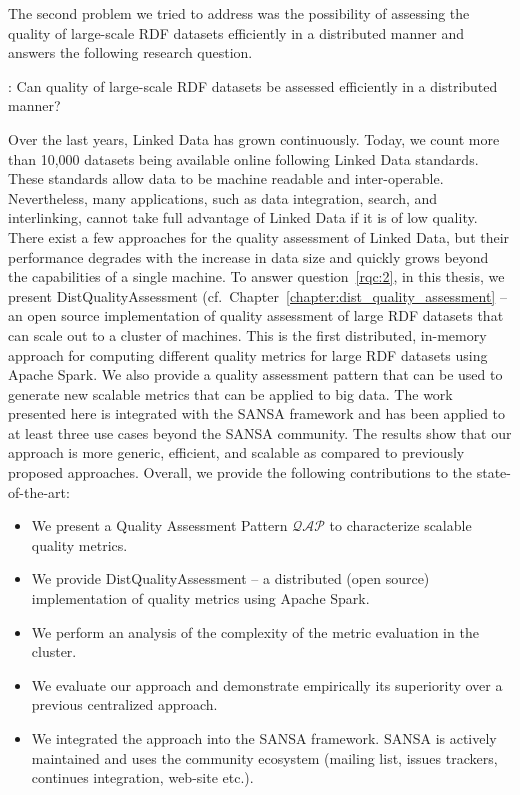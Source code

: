 The second problem we tried to address was the possibility of assessing the quality of large-scale \gls{RDF} datasets efficiently in a distributed manner and answers the following research question.

\begin{tcolorbox}
\textbf{\rqNr[RQ2]\label{rqc:2}}: Can quality of large-scale \gls{RDF} datasets be assessed efficiently in a distributed manner?
\end{tcolorbox}

Over the last years, Linked Data has grown continuously. 
Today, we count more than 10,000 datasets being available online following Linked Data standards. 
These standards allow data to be machine readable and inter-operable.  
Nevertheless, many applications, such as data integration, search, and interlinking, cannot take full advantage of Linked Data if it is of low quality.
There exist a few approaches for the quality assessment of Linked Data, but their performance degrades with the increase in data size and quickly grows beyond the capabilities of a single machine.
To answer question~\ref{rqc:2}, in this thesis, we present DistQualityAssessment (cf.\ Chapter~\ref{chapter:dist_quality_assessment} -- an open source implementation of quality assessment of large \gls{RDF} datasets that can scale out to a cluster of machines.
This is the first distributed, in-memory approach for computing different quality metrics for large \gls{RDF} datasets using Apache Spark. We also provide a quality assessment pattern that can be used to generate new scalable metrics that can be applied to big data.
The work presented here is integrated with the SANSA framework and has been applied to at least three use cases beyond the SANSA community.   
The results show that our approach is more generic, efficient, and scalable as compared to previously proposed approaches.
Overall, we provide the following contributions to the state-of-the-art:
\begin{itemize}
    \item We present a Quality Assessment Pattern $\mathcal{QAP}$ to characterize scalable quality metrics.
    \item We provide DistQualityAssessment -- a distributed (open source) implementation of quality metrics using Apache Spark.
    \item We perform an analysis of the complexity of the metric evaluation in the cluster.
    \item We evaluate our approach and demonstrate empirically its superiority over a previous centralized approach.
    \item We integrated the approach into the SANSA framework.
    SANSA is actively maintained and uses the community ecosystem (mailing list, issues trackers, continues integration, web-site etc.).
\end{itemize}

